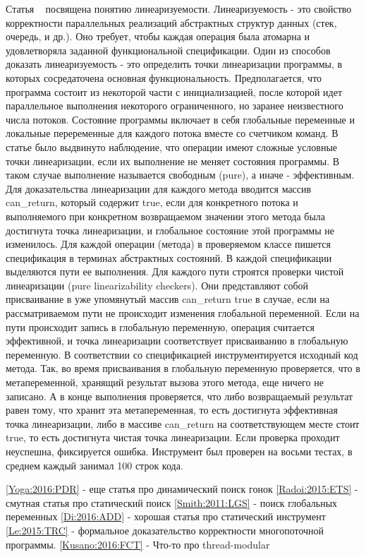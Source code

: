 Статья ~\cite{Vafeiadis:2010} посвящена понятию линеаризуемости.
Линеаризуемость - это свойство корректности параллельных реализаций абстрактных структур данных (стек, очередь, и др.). Оно требует, чтобы каждая операция была атомарна и удовлетворяла заданной функциональной спецификации. Один из способов доказать линеаризуемость - это определить точки линеаризации программы, в которых сосредаточена основная функциональность.
Предполагается, что программа состоит из некоторой части с инициализацией, после которой идет параллельное выполнения некоторого ограниченного, но заранее неизвестного числа потоков. Состояние программы включает в себя глобальные переменные и локальные переременные для каждого потока вместе со счетчиком команд.
В статье было выдвинуто наблюдение, что операции имеют сложные условные точки линеаризации, если их выполнение не меняет состояния программы. В таком случае выполнение называется свободным (pure), а иначе - эффективным. Для доказательства линеаризации для каждого метода вводится массив can\_return, который содержит true, если для конкретного потока и выполняемого при конкретном возвращаемом значении этого метода была достигнута точка линеаризации, и глобальное состояние этой программы не изменилось.
Для каждой операции (метода) в проверяемом классе пишется спецификация в терминах абстрактных состояний. В каждой спецификации выделяются пути ее выполнения. Для каждого пути строятся проверки чистой линеаризации (pure linearizability checkers). Они представляют собой присваивание в уже упомянутый массив can\_return true в случае, если на рассматриваемом пути не происходит изменения глобальной переменной. Если на пути происходит запись в глобальную переменную, операция считается эффективной, и точка линеаризации соответствует присваиванию в глобальную переменную. В соответствии со спецификацией инструментируется исходный код метода. Так, во время присваивания в глобальную переменную проверяется, что в метапеременной, хранящий результат вызова этого метода, еще ничего не записано. А в конце выполнения проверяется, что либо возвращаемый результат равен тому, что хранит эта метапеременная, то есть достигнута эффективная точка линеаризации, либо в массиве can\_return на соответствующем месте стоит true, то есть достигнута чистая точка линеаризации. Если проверка проходит неуспешна, фиксируется ошибка.
Инструмент был проверен на восьми тестах, в среднем каждый занимал 100 строк кода. 

\ref{Yoga:2016:PDR} - еще статья про динамический поиск гонок
\ref{Radoi:2015:ETS} - смутная статья про статический поиск
\ref{Smith:2011:LGS} - поиск глобальных переменных
\ref{Di:2016:ADD} - хорошая статья про статический инструмент
\ref{Le:2015:TRC} - формальное доказательство корректности многопоточной программы.
\ref{Kusano:2016:FCT} - Что-то про thread-modular

